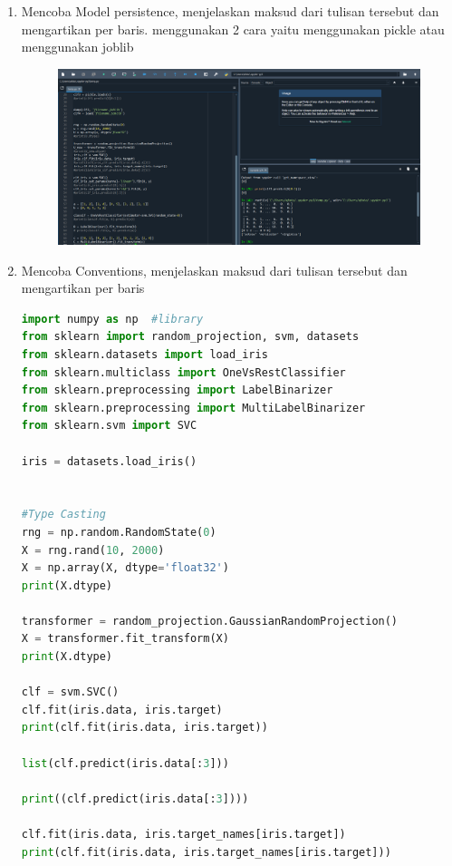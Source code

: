 \begin{enumerate}
\item
Mencoba Model persistence, menjelaskan maksud dari tulisan tersebut dan mengartikan per baris. menggunakan 2 cara yaitu menggunakan pickle atau menggunakan joblib
\begin{figure}[!htbp]
    \centering
    \includegraphics[scale=0.4]{figures/4.png}\\
    \end{figure}

\newpage
\begin{figure}[!htbp]
    \centering
    \end{figure}


\item 
Mencoba Conventions, menjelaskan maksud dari tulisan tersebut dan mengartikan per baris 
\begin{lstlisting}[language=Python]
import numpy as np  #library
from sklearn import random_projection, svm, datasets 
from sklearn.datasets import load_iris
from sklearn.multiclass import OneVsRestClassifier
from sklearn.preprocessing import LabelBinarizer
from sklearn.preprocessing import MultiLabelBinarizer
from sklearn.svm import SVC

iris = datasets.load_iris()


#Type Casting
rng = np.random.RandomState(0) 
X = rng.rand(10, 2000) 
X = np.array(X, dtype='float32')
print(X.dtype)

transformer = random_projection.GaussianRandomProjection()
X = transformer.fit_transform(X)
print(X.dtype)

clf = svm.SVC()
clf.fit(iris.data, iris.target)
print(clf.fit(iris.data, iris.target))

list(clf.predict(iris.data[:3]))

print((clf.predict(iris.data[:3])))

clf.fit(iris.data, iris.target_names[iris.target])
print(clf.fit(iris.data, iris.target_names[iris.target]))


\end{lstlisting}
\end{enumerate}
